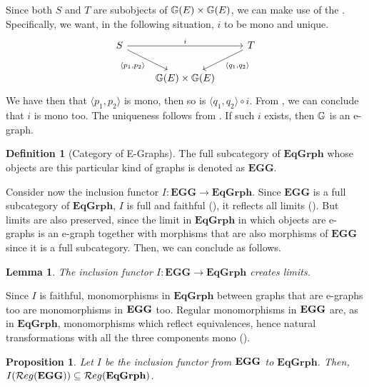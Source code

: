 \documentclass[a4paper, twoside,openright]{report}
\theoremstyle{plain}
\newtheorem{prop}[theorem]{Proposition}
\newtheorem{lemma}[theorem]{Lemma}
\theoremstyle{definition}
\newtheorem{definition}[theorem]{Definition}
\begin{document}
Since both $S$ and $T$ are subobjects of $\mathbb{G}(E) \times \mathbb{G}(E)$, we can make use of the . Specifically, we want, in the following situation, $i$ to be mono and unique.
\[
    \begin{tikzcd}
        S \arrow[rr, "i"] \arrow[dr, "{\langle p_1, p_2 \rangle}"swap] & & T \arrow[dl, "{\langle q_1, q_2\rangle}"] \\
        & \eqgraph{G}(E) \times \eqgraph{G}(E)
    \end{tikzcd}
\]
We have then that $\langle p_1, p_2 \rangle$ is mono, then so is $\langle q_1, q_2 \rangle \circ i$. From , we can conclude that $i$ is mono too. The uniqueness follows from . If such $i$ exists, then $\mathbb{G}$ is an e-graph.

\begin{definition}[Category of E-Graphs]\label{def:cat_of_eggs}
    The full subcategory of $\mathbf{EqGrph}$ whose objects are this particular kind of graphs is denoted as $\mathbf{EGG}$.
\end{definition}

Consider now the inclusion functor $I: \mathbf{EGG} \rightarrow \mathbf{EqGrph}$. Since $\mathbf{EGG}$ is a full subcategory of $\mathbf{EqGrph}$, $I$ is full and faithful (), it reflects all limits (). But limits are also preserved, since the limit in $\mathbf{EqGrph}$ in which objects are e-graphs is an e-graph together with morphisms that are also morphisms of $\mathbf{EGG}$ since it is a full subcategory. Then, we can conclude as follows.

\begin{lemma}
    The inclusion functor $I: \mathbf{EGG \rightarrow EqGrph}$ creates limits.
\end{lemma}

Since $I$ is faithful, monomorphisms in $\mathbf{EqGrph}$ between graphs that are e-graphs too are monomorphisms in $\mathbf{EGG}$ too. Regular monomorphisms in $\mathbf{EGG}$ are, as in $\mathbf{EqGrph}$, monomorphisms which reflect equivalences, hence natural transformations with all the three components mono ().

\begin{prop}
    Let $I$ be the inclusion functor from $\mathbf{EGG}$ to $\mathbf{EqGrph}$. Then, $I(\mathcal{R}eg(\mathbf{EGG})) \subseteq \mathcal{R}eg(\mathbf{EqGrph})$.
\end{prop}
\end{document}
